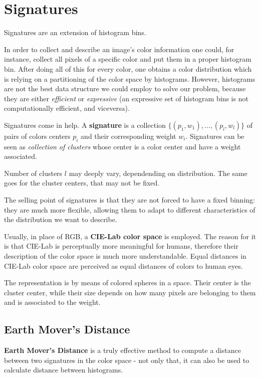 \documentclass[10pt]{report}
\begin{document}
\section{Signatures}
\label{signatures}
Signatures are an extension of histogram bins.

In order to collect and describe an image's color information one could,
for instance, collect all pixels of a specific color and put them in a
proper histogram bin. After doing all of this for every color, one
obtains a color distribution which is relying on a partitioning of the
color space by histograms. However, histograms are not the best data
structure we could employ to solve our problem, because they are either
\emph{efficient} or \emph{expressive} (an expressive set of histogram bins is not
computationally efficient, and viceversa).

Signatures come in help. A \textbf{signature} is a collection
\(\{(p_1, w_1), \dots, (p_l, w_l)\}\) of pairs of colors centers \(p_i\)
and their corresponding weight \(w_i\). Signatures can be seen as
\emph{collection of clusters} whose center is a color center and have a
weight associated.

Number of clusters \(l\) may deeply vary, dependending on distribution.
The same goes for the cluster centers, that may not be fixed.

The selling point of signatures is that they are not forced to have a
fixed binning: they are much more flexible, allowing them to adapt to
different characteristics of the distribution we want to describe.

Usually, in place of RGB, a \textbf{CIE-Lab color space} is employed. The
reason for it is that CIE-Lab is perceptually more meaningful for
humans, therefore their description of the color space is much more
understandable. Equal distances in CIE-Lab color space are perceived as
equal distances of colors to human eyes.

The representation is by means of colored spheres in a space. Their
center is the cluster center, while their size depends on how many
pixels are belonging to them and is associated to the weight.

\subsection{Earth Mover's Distance}
\label{earth-movers-distance}
\textbf{Earth Mover's Distance} is a truly effective method to compute a
distance between two signatures in the color space - not only that, it
can also be used to calculate distance between histograms.
\end{document}
